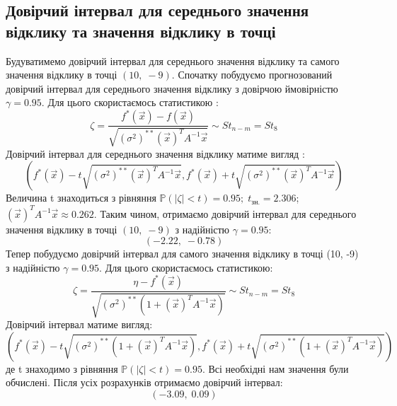 \documentclass{article}
\begin{document}
    \subsection{Довірчий інтервал для середнього значення відклику та значення відклику в точці}
      Будуватимемо довірчий інтервал для середнього значення відклику та самого 
      значення відклику в точці $ (10, \;-9) $.
      \newline
      Спочатку побудуємо прогнозований довірчий інтервал для середнього значення 
      відклику з довірчою ймовірністю $\gamma = 0.95$. Для цього скористаємось 
      статистикою :
      \begin{equation}
        \zeta = \frac{f^*(\vec{x}) - f(\vec{x})}{\sqrt{(\sigma^2)^{**}(\vec{x})^TA^{-1}\vec{x}}}
        \sim St_{n-m} = St_{8}
      \end{equation}
      Довірчий інтервал для середнього значення відклику матиме вигляд :
      \begin{equation}
        \left( f^*(\vec{x}) - t\sqrt{(\sigma^2)^{**}(\vec{x})^TA^{-1}\vec{x}}, 
        f^*(\vec{x}) + t\sqrt{(\sigma^2)^{**}(\vec{x})^TA^{-1}\vec{x}} \right)
      \end{equation}
      Величина t знаходиться з рівняння $\mathbb{P}(|\zeta| < t) = 0.95; \; t_\text{зн.} = 
      2.306$;\;
      $(\vec{x})^TA^{-1}\vec{x} \approx 0.262$.
      \newline
      Таким чином, отримаємо довірчий інтервал для середнього значення відклику в 
      точці $ (10, \;-9) $ з надійністю $\gamma = 0.95$:
      \begin{equation}
        (-2.22,\; -0.78)
      \end{equation}
      Тепер побудуємо довірчий інтервал для самого значення відклику в точці (10, -9) 
      з надійністю $\gamma = 0.95$. Для цього скористаємось статистикою:
      \begin{equation}
        \zeta = \frac{\eta - f^*(\vec{x})}{\sqrt{(\sigma^2)^{**}(1 + (\vec{x})^TA^{-1}\vec{x})}}      
        \sim St_{n-m} = St_{8}
      \end{equation}
      Довірчий інтервал матиме вигляд:
      \begin{equation}
        \left(f^*(\vec{x}) - t\sqrt{(\sigma^2)^{**}(1 + (\vec{x})^TA^{-1}\vec{x})}, 
        f^*(\vec{x}) + t\sqrt{(\sigma^2)^{**}(1 + (\vec{x})^TA^{-1}\vec{x})}\right)
      \end{equation}
      де t знаходимо з рівняння $\mathbb{P}(|\zeta| < t) = 0.95$.
      Всі необхідні нам значення були обчислені. Після усіх розрахунків отримаємо 
      довірчий інтервал:
      \begin{equation}
        (-3.09,\;0.09)
      \end{equation}
      \newpage
\end{document}
